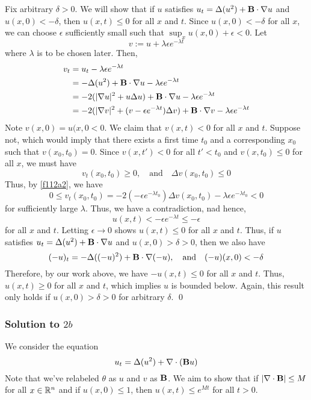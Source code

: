 Fix arbitrary $\delta > 0$. We will show that if $u$ satisfies $u_t = \Delta (u^2) + \textbf{B} \cdot \nabla u$ and $u(x,0) < - \delta$, then $u(x,t) \leq 0$ for all $x$ and $t$. Since $u(x,0) < -\delta$ for all $x$, we can choose $\epsilon$ sufficiently small such that $\sup_{x} u(x,0) + \epsilon < 0$. Let
$$ v := u + \lambda \epsilon e^{-\lambda t} $$
where $\lambda$ is to be chosen later. Then,
\begin{align}
\notag v_t &= u_t - \lambda \epsilon e^{-\lambda t} \\
\notag &= -\Delta (u^2) + \textbf{B} \cdot \nabla u - \lambda \epsilon e^{-\lambda t} \\
\notag &= -2 (|\nabla u|^2 + u \Delta u) + \textbf{B} \cdot \nabla u - \lambda \epsilon e^{-\lambda t} \\
\label{f112a2} &= -2 (|\nabla v|^2 + (v-\epsilon e^{-\lambda t}) \Delta v) + \textbf{B} \cdot \nabla v - \lambda \epsilon e^{-\lambda t}
\end{align}
Note $v(x,0) = u(x,0 < 0$. We claim that $v(x,t) < 0$ for all $x$ and $t$. Suppose not, which would imply that there exists a first time $t_0$ and a corresponding $x_0$ such that $v(x_0,t_0) = 0$. Since $v(x,t') < 0$ for all $t' < t_0$ and $v(x,t_0) \leq 0$ for all $x$, we must have
$$v_t(x_0,t_0) \geq 0, \quad \text{and} \quad \Delta v(x_0,t_0) \leq 0$$
Thus, by \eqref{f112a2}, we have
$$ 0 \leq v_t(x_0,t_0) = -2(-\epsilon e^{-\lambda t_0}) \Delta v(x_0,t_0) - \lambda \epsilon e^{-\lambda t_0} < 0$$
for sufficiently large $\lambda$. Thus, we have a contradiction, nad hence,
$$ u(x,t) < -\epsilon e^{-\lambda t} \leq -\epsilon $$
for all $x$ and $t$. Letting $\epsilon \to 0$ shows $u(x,t) \leq 0$ for all $x$ and $t$. Thus, if $u$ satisfies $ u_t = \Delta (u^2) + \textbf{B} \cdot \nabla u $ and $u(x,0) > \delta > 0$, then we also have
$$ (-u)_t = -\Delta ((-u)^2) + \textbf{B} \cdot \nabla (-u), \quad \text{and} \quad (-u)(x,0) < -\delta $$
Therefore, by our work above, we have $-u(x,t) \leq 0$ for all $x$ and $t$. Thus, $u(x,t) \geq 0$ for all $x$ and $t$, which implies $u$ is bounded below. Again, this result only holds if $u(x,0) > \delta > 0$ for arbitrary $\delta$. \hfill \qed


\subsubsection*{Solution to $2b$}

We consider the equation
$$ u_t = \Delta (u^2) + \nabla \cdot (\textbf{B} u) $$
Note that we've relabeled $\theta$ as $u$ and $v$ as $\textbf{B}$. We aim to show that if $|\nabla \cdot \textbf{B}| \leq M$ for all $x \in \mathbb{R}^n$ and if $u(x,0) \leq 1$, then $u(x,t) \leq e^{Mt}$ for all $t > 0$.

